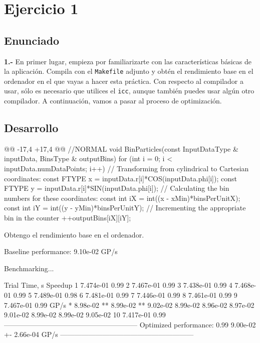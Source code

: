 \section{Ejercicio 1}
\subsection{Enunciado}
\begin{ejer}
    \textbf{1.-} En primer lugar, empieza por familiarizarte con las características básicas de la aplicación. 
    Compila con el \texttt{Makefile} adjunto y obtén el rendimiento base en el ordenador en el que vayas a hacer esta
    práctica. Con respecto al compilador a usar, sólo es necesario que utilices el \texttt{icc}, aunque también
    puedes usar algún otro compilador. A continuación, vamos a pasar al proceso de optimización. 
\end{ejer}
\newpage
\subsection{Desarrollo}
\begin{listing}[firstnumber=16]
    @@ -17,4 +17,4 @@
    //NORMAL
    void BinParticles(const InputDataType & inputData, BinsType & outputBins) {
        for (int i = 0; i < inputData.numDataPoints; i++) {
            // Transforming from cylindrical to Cartesian coordinates: 
            const FTYPE x = inputData.r[i]*COS(inputData.phi[i]); 
            const FTYPE y = inputData.r[i]*SIN(inputData.phi[i]);
            // Calculating the bin numbers for these coordinates: 
            const int iX = int((x - xMin)*binsPerUnitX);
            const int iY = int((y - yMin)*binsPerUnitY);
            // Incrementing the appropriate bin in the counter
            ++outputBins[iX][iY];
        }
    }
\end{listing}
\par Obtengo el rendimiento base en el ordenador.
\begin{listing}[style=consola]
    Baseline performance: 9.10e-02 GP/s 

    Benchmarking...

        Trial Time, s Speedup
            1 7.474e-01 0.99
            2 7.467e-01 0.99
            3 7.438e-01 0.99
            4 7.468e-01 0.99
            5 7.489e-01 0.98
            6 7.481e-01 0.99
            7 7.446e-01 0.99
            8 7.461e-01 0.99
            9 7.467e-01 0.99
            GP/s * 8.98e-02 ** 8.99e-02 **
            9.02e-02
            8.99e-02
            8.96e-02
            8.97e-02
            9.01e-02
            8.99e-02
            8.99e-02
            9.05e-02
            10 7.417e-01 0.99 
    --------------------------------------------------------- 
    Optimized performance: 0.99 9.00e-02 +- 2.66e-04 GP/s
    ---------------------------------------------------------
\end{listing}
